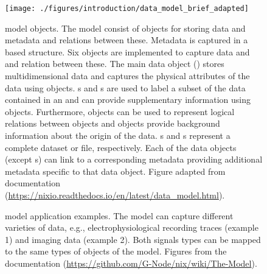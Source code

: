 \begin{figure}
 \texttt{[image: ./figures/introduction/data\_model\_brief\_adapted]}
 \caption[ model objects]{ model objects. The model consist of objects for storing data and metadata and relations between these. Metadata is captured in a  based structure. Six objects are implemented to capture data and and relation between these. The main data object () stores multidimensional data and captures the physical attributes of the data using  objects. s and s are used to label a subset of the data contained in an  and can provide supplementary information using  objects. Furthermore,  objects can be used to represent logical relations between objects and  objects provide background information about the origin of the data. s and s represent a complete dataset or file, respectively. Each of the data objects (except s) can link to a corresponding metadata  providing additional metadata specific to that data object. Figure adapted from  documentation (\url{https://nixio.readthedocs.io/en/latest/data_model.html}).}
 \label{fig:intro_nix_model}
\end{figure}

\begin{figure}
 \centering
 \scalebox{0.45}{
 }
 \caption[ model application examples]{ model application examples. The model can capture different varieties of data, e.g., electrophysiological recording traces (example 1) and imaging data (example 2). Both signals types can be mapped to the same types of objects of the  model. Figures from  the documentation (\url{https://github.com/G-Node/nix/wiki/The-Model}).}
 \label{fig:intro_nix_examples}
\end{figure}


